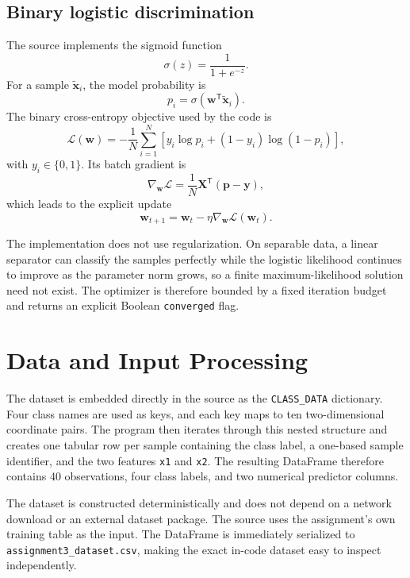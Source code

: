 \documentclass[11pt,a4paper]{article}
\newcommand{\code}[1]{\texttt{#1}}
\begin{document}
\subsection{Binary logistic discrimination}
The source implements the sigmoid function
\begin{equation}
\sigma(z)=\frac{1}{1+e^{-z}}.
\end{equation}
For a sample \(\tilde{\mathbf{x}}_i\), the model probability is
\begin{equation}
p_i=\sigma(\mathbf{w}^{\mathsf T}\tilde{\mathbf{x}}_i).
\end{equation}
The binary cross-entropy objective used by the code is
\begin{equation}
\mathcal{L}(\mathbf{w})
=-\frac{1}{N}\sum_{i=1}^{N}
\left[y_i\log p_i+(1-y_i)\log(1-p_i)\right],
\end{equation}
with \(y_i\in\{0,1\}\). Its batch gradient is
\begin{equation}
\nabla_{\mathbf{w}}\mathcal{L}
=\frac{1}{N}\mathbf{X}^{\mathsf T}(\mathbf{p}-\mathbf{y}),
\end{equation}
which leads to the explicit update
\begin{equation}
\mathbf{w}_{t+1}=\mathbf{w}_t-\eta\nabla_{\mathbf{w}}\mathcal{L}(\mathbf{w}_t).
\end{equation}

The implementation does not use regularization. On separable data, a linear separator can classify the samples perfectly while the logistic likelihood continues to improve as the parameter norm grows, so a finite maximum-likelihood solution need not exist. The optimizer is therefore bounded by a fixed iteration budget and returns an explicit Boolean \code{converged} flag.

\section{Data and Input Processing}
The dataset is embedded directly in the source as the \code{CLASS\_DATA} dictionary. Four class names are used as keys, and each key maps to ten two-dimensional coordinate pairs. The program then iterates through this nested structure and creates one tabular row per sample containing the class label, a one-based sample identifier, and the two features \code{x1} and \code{x2}. The resulting DataFrame therefore contains 40 observations, four class labels, and two numerical predictor columns.

The dataset is constructed deterministically and does not depend on a network download or an external dataset package. The source uses the assignment's own training table as the input. The DataFrame is immediately serialized to \code{assignment3\_dataset.csv}, making the exact in-code dataset easy to inspect independently.
\end{document}
